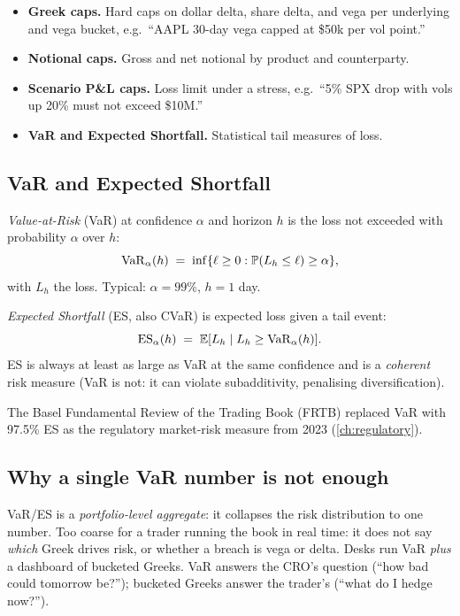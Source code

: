 \begin{itemize}
  \item \textbf{Greek caps.}  Hard caps on dollar delta, share
    delta, and vega per underlying and vega bucket, e.g.\ ``AAPL
    30-day vega capped at \$50k per vol point.''
  \item \textbf{Notional caps.}  Gross and net notional by product
    and counterparty.
  \item \textbf{Scenario P\&L caps.}  Loss limit under a stress,
    e.g.\ ``5\% SPX drop with vols up 20\% must not exceed
    \$10M.''
  \item \textbf{VaR and Expected Shortfall.}  Statistical tail
    measures of loss.
\end{itemize}

\subsection{VaR and Expected Shortfall}

\emph{Value-at-Risk} (VaR) at confidence $\alpha$ and horizon $h$
is the loss not exceeded with probability $\alpha$ over $h$:
\[
  \mathrm{VaR}_\alpha(h)
  \;=\; \inf \{ \ell \ge 0 : \mathbb{P}(L_h \le \ell) \ge \alpha \},
\]
with $L_h$ the loss.  Typical: $\alpha = 99\%$, $h = 1$ day.

\emph{Expected Shortfall} (ES, also CVaR) is expected loss given a
tail event:
\[
  \mathrm{ES}_\alpha(h)
  \;=\; \mathbb{E}[L_h \mid L_h \ge \mathrm{VaR}_\alpha(h)].
\]
ES is always at least as large as VaR at the same confidence and
is a \emph{coherent} risk measure (VaR is not: it can violate
subadditivity, penalising diversification).

The Basel Fundamental Review of the Trading Book (FRTB) replaced
VaR with 97.5\% ES as the regulatory market-risk measure from 2023
(\cref{ch:regulatory}).

\subsection{Why a single VaR number is not enough}

VaR/ES is a \emph{portfolio-level aggregate}: it collapses the
risk distribution to one number.  Too coarse for a trader running
the book in real time: it does not say \emph{which} Greek drives
risk, or whether a breach is vega or delta.  Desks run VaR
\emph{plus} a dashboard of bucketed Greeks.  VaR answers the CRO's
question (``how bad could tomorrow be?''); bucketed Greeks answer
the trader's (``what do I hedge now?'').

